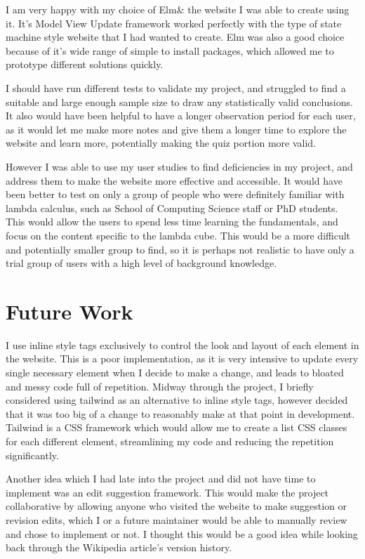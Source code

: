 \documentclass{l4proj}
\begin{document}
I am very happy with my choice of Elm\& the website I was able to create using it.  It's Model  View Update framework worked perfectly with the type of state machine style website that I had wanted to create.  Elm was also a good choice because of it's wide range of simple to install packages, which allowed me to prototype different solutions quickly.

I should have run different tests to validate my project, and struggled to find a suitable and large enough sample size to draw any statistically valid conclusions.  It also would have been helpful to have a longer observation period for each user, as it would let me make more notes and give them a longer time to explore the website and learn more, potentially making the quiz portion more valid.  

However I was able to use my user studies to find deficiencies in my project, and address them to make the website more effective and accessible.  It would have been better to test on only a group of people who were definitely familiar with lambda calculus, such as School of Computing Science staff or PhD students.  This would allow the users to spend less time learning the fundamentals, and focus on the content specific to the lambda cube.  This would be a more difficult and potentially smaller group to find, so it is perhaps not realistic to have only a trial group of users with a high level of background knowledge.

\section{Future Work}

I use inline style tags exclusively to control the look and layout of each element in the website.  This is a poor implementation, as it is very intensive to update every single necessary element when I decide to make a change, and leads to bloated and messy code full of repetition.  Midway through the project, I briefly considered using tailwind as an alternative to inline style tags, however decided that it was too big of a change to reasonably make at that point in development. Tailwind is a CSS framework which would allow me to create a list CSS classes for each different element, streamlining my code and reducing the repetition significantly. 

Another idea which I had late into the project and did not have time to implement was an edit suggestion framework.  This would make the project collaborative by allowing anyone who visited the website to make suggestion or revision edits, which I or a future maintainer would be able to manually review and chose to implement or not.  I thought this would be a good idea while looking back through the Wikipedia article's version history.
\end{document}
